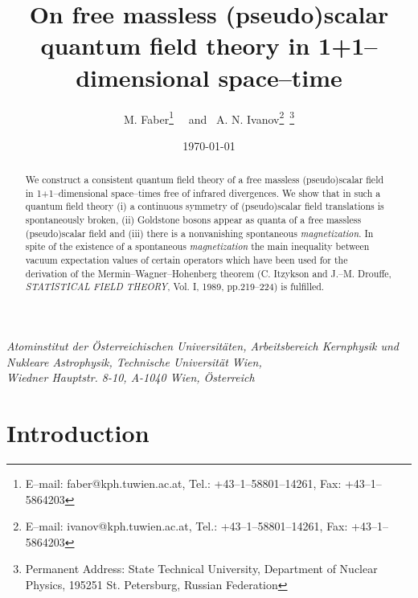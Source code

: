 \documentclass[a4paper,12pt] {article}
\begin{document}
\setcounter{page}{1}
\def\theequation{\arabic{section}.\arabic{equation}}
\def\theequation{\thesection.\arabic{equation}}
\setcounter{section}{0}

\title{On free massless (pseudo)scalar quantum field theory in
1+1--dimensional space--time}

\author{M. Faber\thanks{E--mail: faber@kph.tuwien.ac.at, Tel.:
+43--1--58801--14261, Fax: +43--1--5864203} ~~and~
A. N. Ivanov\thanks{E--mail: ivanov@kph.tuwien.ac.at, Tel.:
+43--1--58801--14261, Fax: +43--1--5864203}~\thanks{Permanent Address:
State Technical University, Department of Nuclear Physics, 195251
St. Petersburg, Russian Federation}}

\date{\today}

\maketitle
\vspace{-0.5in}
\begin{center}
{\it Atominstitut der \"Osterreichischen Universit\"aten,
Arbeitsbereich Kernphysik und Nukleare Astrophysik, Technische
Universit\"at Wien, \\ Wiedner Hauptstr. 8-10, A-1040 Wien,
\"Osterreich }
\end{center}

\begin{center}
\begin{abstract}
We construct a consistent quantum field theory of a free massless
(pseudo)scalar field in 1+1--dimensional space--times free of infrared
divergences. We show that in such a quantum field theory (i) a
continuous symmetry of (pseudo)scalar field translations is
spontaneously broken, (ii) Goldstone bosons appear as quanta of a free
massless (pseudo)scalar field and (iii) there is a nonvanishing
spontaneous {\it magnetization}. In spite of the existence of a
spontaneous {\it magnetization} the main inequality between vacuum
expectation values of certain operators which have been used for the
derivation of the Mermin--Wagner--Hohenberg theorem (C. Itzykson and
J.--M. Drouffe, {\it STATISTICAL FIELD THEORY}, Vol. I, 1989,
pp.219--224) is fulfilled. 
\end{abstract}
\end{center}

\newpage

\section{Introduction}
\setcounter{equation}{0}
\end{document}
